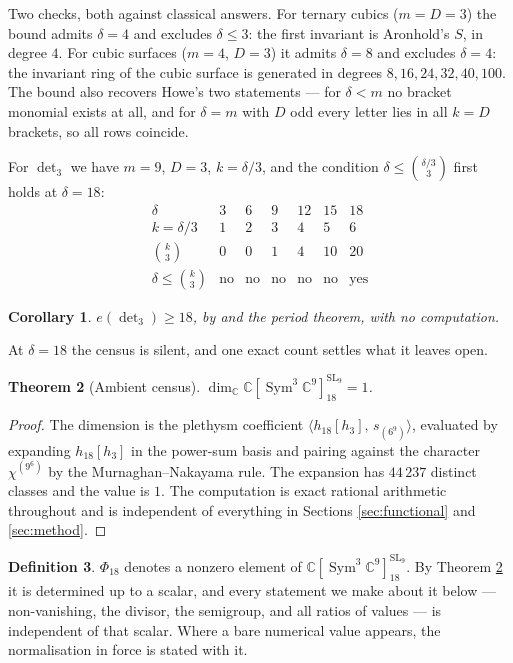 \documentclass[11pt,reqno]{amsart}
\theoremstyle{plain}
\newtheorem{theorem}{Theorem}[section]
\newtheorem{corollary}[theorem]{Corollary}
\theoremstyle{definition}
\newtheorem{definition}[theorem]{Definition}
\DeclareMathOperator{\SL}{SL}
\DeclareMathOperator{\Sym}{Sym}
\newcommand{\bC}{\mathbb{C}}
\begin{document}
Two checks, both against classical answers.  For ternary cubics ($m=D=3$) the
bound admits $\delta=4$ and excludes $\delta\le3$: the first invariant is
Aronhold's $S$, in degree $4$.  For cubic surfaces ($m=4$, $D=3$) it admits
$\delta=8$ and excludes $\delta=4$: the invariant ring of the cubic surface is
generated in degrees $8,16,24,32,40,100$.  The bound also recovers Howe's two
statements --- for $\delta<m$ no bracket monomial exists at all, and for
$\delta=m$ with $D$ odd every letter lies in all $k=D$ brackets, so all rows
coincide.

For $\det_3$ we have $m=9$, $D=3$, $k=\delta/3$, and the condition
$\delta\le\binom{\delta/3}{3}$ first holds at $\delta=18$:
\[
\begin{array}{c|cccccc}
 \delta & 3 & 6 & 9 & 12 & 15 & 18\\ \hline
 k=\delta/3 & 1 & 2 & 3 & 4 & 5 & 6\\
 \binom{k}{3} & 0 & 0 & 1 & 4 & 10 & 20\\
 \delta\le\binom{k}{3} & \text{no} & \text{no} & \text{no} & \text{no} &
   \text{no} & \text{yes}
\end{array}
\]

\begin{corollary}\label{cor:lower}
$e(\det_3)\ge 18$, by \cite[Cor.~7.2]{BI} and the period theorem, with no
computation.
\end{corollary}

At $\delta=18$ the census is silent, and one exact count settles what it leaves
open.

\begin{theorem}[Ambient census]\label{thm:ambient}
$\dim_\bC\bC[\Sym^{3}\bC^{9}]^{\SL_9}_{18}=1$.
\end{theorem}

\begin{proof}
The dimension is the plethysm coefficient
$\langle h_{18}[h_3],\,s_{(6^{9})}\rangle$, evaluated by expanding
$h_{18}[h_3]$ in the power-sum basis and pairing against the character
$\chi^{(9^{6})}$ by the Murnaghan--Nakayama rule.  The expansion has $44\,237$
distinct classes and the value is $1$.  The computation is exact rational
arithmetic throughout and is independent of everything in Sections
\ref{sec:functional} and \ref{sec:method}.
\end{proof}

\begin{definition}\label{def:phi18}
$\Phi_{18}$ denotes a nonzero element of $\bC[\Sym^{3}\bC^{9}]^{\SL_9}_{18}$.
By Theorem \ref{thm:ambient} it is determined up to a scalar, and every
statement we make about it below --- non-vanishing, the divisor, the semigroup,
and all ratios of values --- is independent of that scalar.  Where a bare
numerical value appears, the normalisation in force is stated with it.
\end{definition}
\end{document}
